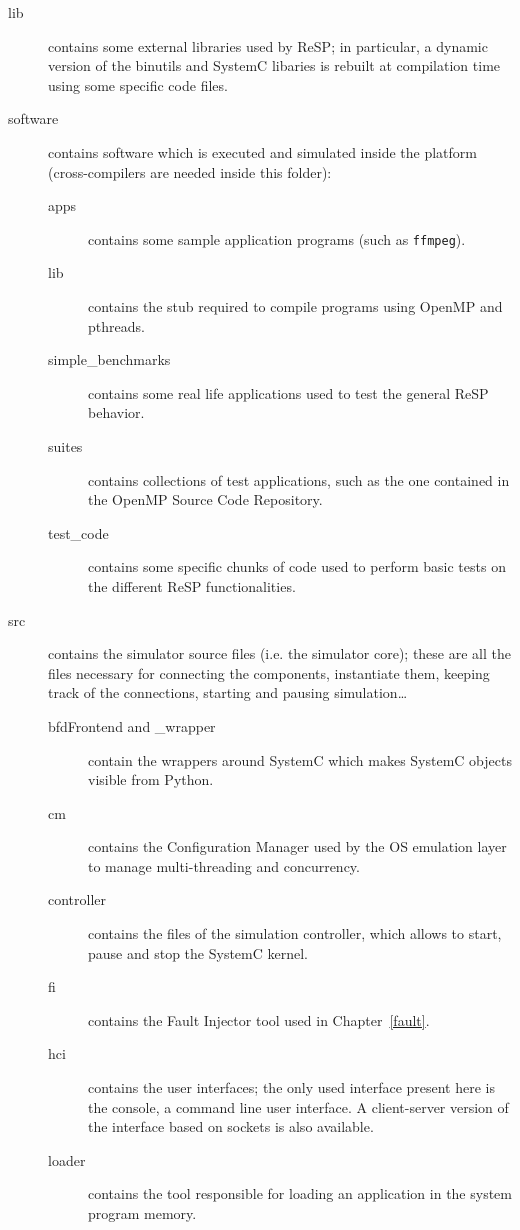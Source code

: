 \begin{description}
  \item[lib] contains some external libraries used by ReSP; in particular, a dynamic version of the binutils and SystemC libaries is rebuilt at compilation time using some specific code files.
  \item[software] contains software which is executed and simulated inside the platform (cross-compilers are needed inside this folder):
  \begin{description}
    \item[apps] contains some sample application programs (such as \texttt{ffmpeg}).
    \item[lib] contains the stub required to compile programs using OpenMP and pthreads.
    \item[simple\_benchmarks] contains some real life applications used to test the general ReSP behavior.
    \item[suites] contains collections of test applications, such as the one contained in the OpenMP Source Code Repository.
    \item[test\_code] contains some specific chunks of code used to perform basic tests on the different ReSP functionalities.
  \end{description}
  \item[src] contains the simulator source files (i.e. the simulator core); these are all the files necessary for connecting the components, instantiate them, keeping track of the connections, starting and pausing simulation\ldots
  \begin{description}
    \item[bfdFrontend and \textasteriskcentered\_wrapper] contain the wrappers around SystemC which makes SystemC objects visible from Python.
    \item[cm] contains the Configuration Manager used by the OS emulation layer to manage multi-threading and concurrency.
    \item[controller] contains the files of the simulation controller, which allows to start, pause and stop the SystemC kernel.
    \item[fi] contains the Fault Injector tool used in Chapter~\ref{fault}.
    \item[hci] contains the user interfaces; the only used interface present here is the console, a command line user interface. A client-server version of the interface based on sockets is also available.
    \item[loader] contains the tool responsible for loading an application in the system program memory.

\end{description}
\end{description}
